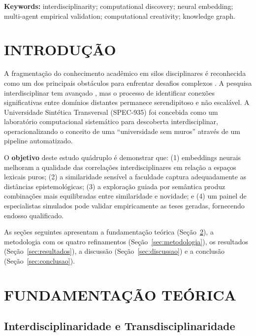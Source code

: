 \documentclass[a4paper,12pt]{article}
\begin{document}
\textbf{Keywords:} interdisciplinarity; computational discovery; neural embedding; 
multi-agent empirical validation; computational creativity; knowledge graph.


\section{INTRODUÇÃO}

A fragmentação do conhecimento acadêmico em silos disciplinares é reconhecida como 
um dos principais obstáculos para enfrentar desafios complexos \cite{morin2000, nicolescu1996, klein2010}. 
A pesquisa interdisciplinar tem avançado \cite{frodeman2017, bammer2013}, mas o processo de 
identificar conexões significativas entre domínios distantes permanece serendipitoso e não 
escalável. A Universidade Sintética Transversal (SPEC-935) foi concebida como um laboratório 
computacional sistemático para descoberta interdisciplinar, operacionalizando o conceito de 
uma ``universidade sem muros'' \cite{barnett2011} através de um pipeline automatizado.

O \textbf{objetivo} deste estudo quádruplo é demonstrar que: (1) embeddings neurais melhoram 
a qualidade das correlações interdisciplinares em relação a espaços lexicais puros; 
(2) a similaridade sensível a faculdade captura adequadamente as distâncias epistemológicas; 
(3) a exploração guiada por semântica produz combinações mais equilibradas entre similaridade 
e novidade; e (4) um painel de especialistas simulados pode validar empiricamente as teses 
geradas, fornecendo endosso qualificado.

As seções seguintes apresentam a fundamentação teórica (Seção~\ref{sec:fundamentacao}), 
a metodologia com os quatro refinamentos (Seção~\ref{sec:metodologia}), os resultados 
(Seção~\ref{sec:resultados}), a discussão (Seção~\ref{sec:discussao}) e a conclusão 
(Seção~\ref{sec:conclusao}).


\section{FUNDAMENTAÇÃO TEÓRICA}\label{sec:fundamentacao}

\subsection{Interdisciplinaridade e Transdisciplinaridade}
\end{document}
